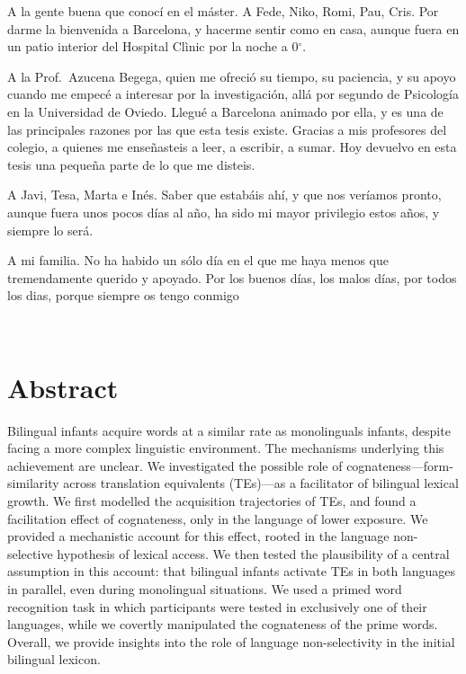 \documentclass[
  12pt,
  b5paperpaper,
  twoside]{scrreprt}
\begin{document}
\begin{spacing}{1.5}
{A la gente buena que conocí en el máster. A Fede, Niko, Romi, Pau, Cris.
Por darme la bienvenida a Barcelona, y hacerme sentir como en casa,
aunque fuera en un patio interior del Hospital Clìnic por la noche a
0\(^{\circ}\).

A la Prof.~Azucena Begega, quien me ofreció su tiempo, su paciencia, y
su apoyo cuando me empecé a interesar por la investigación, allá por
segundo de Psicología en la Universidad de Oviedo. Llegué a Barcelona
animado por ella, y es una de las principales razones por las que esta
tesis existe. Gracias a mis profesores del colegio, a quienes me
enseñasteis a leer, a escribir, a sumar. Hoy devuelvo en esta tesis una
pequeña parte de lo que me disteis.

A Javi, Tesa, Marta e Inés. Saber que estabáis ahí, y que nos veríamos
pronto, aunque fuera unos pocos días al año, ha sido mi mayor privilegio
estos años, y siempre lo será.

A mi familia. No ha habido un sólo día en el que me haya menos que
tremendamente querido y apoyado. Por los buenos días, los malos días,
por todos los dias, porque siempre os tengo conmigo}
\clearpage

\clearpage
~
\thispagestyle{empty}
\clearpage


\clearpage
\section*{\sffamily Abstract}
\normalsize{Bilingual infants acquire words at a similar rate as
monolinguals infants, despite facing a more complex linguistic
environment. The mechanisms underlying this achievement are unclear. We
investigated the possible role of cognateness---form-similarity across
translation equivalents (TEs)---as a facilitator of bilingual lexical
growth. We first modelled the acquisition trajectories of TEs, and found
a facilitation effect of cognateness, only in the language of lower
exposure. We provided a mechanistic account for this effect, rooted in
the language non-selective hypothesis of lexical access. We then tested
the plausibility of a central assumption in this account: that bilingual
infants activate TEs in both languages in parallel, even during
monolingual situations. We used a primed word recognition task in which
participants were tested in exclusively one of their languages, while we
covertly manipulated the cognateness of the prime words. Overall, we
provide insights into the role of language non-selectivity in the
initial bilingual lexicon.}
\vspace*{\baselineskip}
\clearpage


\end{spacing}
\end{document}
